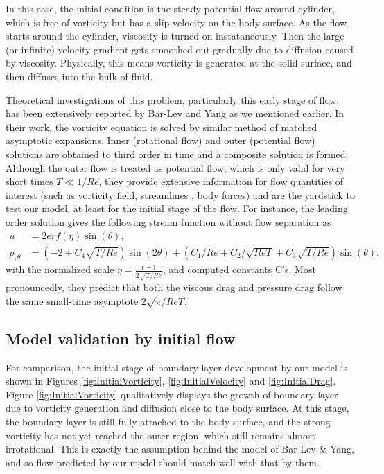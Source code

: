 In this case, the initial condition is the steady potential flow around cylinder, which is free of vorticity but has a slip velocity on the body surface.
As the flow starts around the cylinder, viscosity is turned on instataneously.
Then the large (or infinite) velocity gradient gets smoothed out gradually due to diffusion caused by viscosity.
Physically, this means vorticity is generated at the solid surface, and then diffuses into the bulk of fluid.

Theoretical investigations of this problem, particularly this early stage of flow, has been extensively reported by Bar-Lev and Yang \cite{bar1975initial} as we mentioned earlier.
In their work, the vorticity equation is solved by similar method of matched asymptotic expansions.
Inner (rotational flow) and outer (potential flow) solutions are obtained to third order in time and a composite solution is formed.
Although the outer flow is treated as potential flow, which is only valid for very short times $T \ll 1/Re$, they provide extensive information for flow quantities of interest (such as vorticity field, streamlines , body forces) and are the yardstick to test our model, at least for the initial stage of the flow.
For instance, the leading order solution gives the following stream function without flow separation as 
\begin{align} \label{eqn:BarLevYang1}
u & = 2 erf(\eta) \sin(\theta), \\  
p_{, \theta} & = (-2 + C_4 \sqrt{T/Re}) \sin (2 \theta) + (C_1/Re + C_2/\sqrt{ReT} + C_3 \sqrt{T/Re} ) \sin(\theta). 
\end{align}
with the normalized scale $\eta = \frac{r-1}{2\sqrt{T/Re}}$, and computed constants C's.
Most pronouncedly, they predict that both the viscous drag and pressure drag follow the same small-time asymptote $2\sqrt{\pi/ReT}$.

\subsection{Model validation by initial flow}

For comparison, the initial stage of boundary layer development by our model is shown in Figures \ref{fig:InitialVorticity}, \ref{fig:InitialVelocity} and \ref{fig:InitialDrag}.
Figure \ref{fig:InitialVorticity} qualitatively displays the growth of boundary layer due to vorticity generation and diffusion close to the body surface.
At this stage, the boundary layer is still fully attached to the body surface, and the strong vorticity has not yet reached the outer region, which still remains almost irrotational. 
This is exactly the assumption behind the model of Bar-Lev \& Yang, and so flow predicted by our model should match well with that by them.

